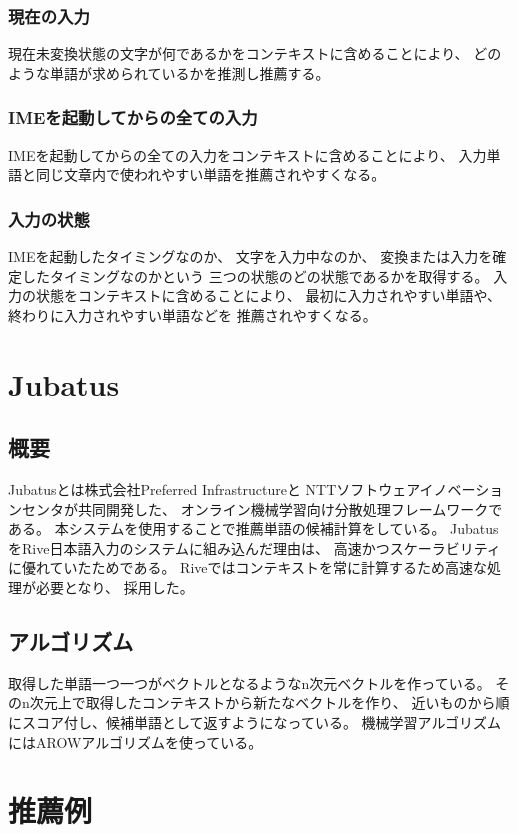 \subsubsection{現在の入力}
現在未変換状態の文字が何であるかをコンテキストに含めることにより、
どのような単語が求められているかを推測し推薦する。

\subsubsection{IMEを起動してからの全ての入力}
IMEを起動してからの全ての入力をコンテキストに含めることにより、
入力単語と同じ文章内で使われやすい単語を推薦されやすくなる。

\subsubsection{入力の状態}
IMEを起動したタイミングなのか、
文字を入力中なのか、
変換または入力を確定したタイミングなのかという
三つの状態のどの状態であるかを取得する。
入力の状態をコンテキストに含めることにより、
最初に入力されやすい単語や、終わりに入力されやすい単語などを
推薦されやすくなる。

\section{Jubatus}
\label{sec:jubatus}

\subsection{概要}
Jubatus\cite{jubatus}とは株式会社Preferred Infrastructureと
NTTソフトウェアイノベーションセンタが共同開発した、
オンライン機械学習向け分散処理フレームワークである。
本システムを使用することで推薦単語の候補計算をしている。
JubatusをRive日本語入力のシステムに組み込んだ理由は、
高速かつスケーラビリティに優れていたためである。
Riveではコンテキストを常に計算するため高速な処理が必要となり、
採用した。

\subsection{アルゴリズム}
取得した単語一つ一つがベクトルとなるようなn次元ベクトルを作っている。
そのn次元上で取得したコンテキストから新たなベクトルを作り、
近いものから順にスコア付し、候補単語として返すようになっている。
機械学習アルゴリズムにはAROWアルゴリズム\cite{AROW}を使っている。

\section{推薦例}

